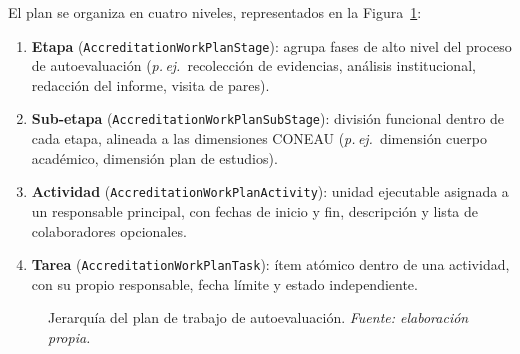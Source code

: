 El plan se organiza en cuatro niveles, representados en la
Figura~\ref{fig:workplan_jerarquia}:

\begin{enumerate}
  \item \textbf{Etapa} (\texttt{AccreditationWorkPlanStage}): agrupa fases
    de alto nivel del proceso de autoevaluación
    (\textit{p.\,ej.}\ recolección de evidencias, análisis institucional,
    redacción del informe, visita de pares).
  \item \textbf{Sub-etapa} (\texttt{AccreditationWorkPlanSubStage}): división
    funcional dentro de cada etapa, alineada a las dimensiones CONEAU
    (\textit{p.\,ej.}\ dimensión cuerpo académico, dimensión plan de estudios).
  \item \textbf{Actividad} (\texttt{AccreditationWorkPlanActivity}): unidad
    ejecutable asignada a un responsable principal, con fechas de inicio
    y fin, descripción y lista de colaboradores opcionales.
  \item \textbf{Tarea} (\texttt{AccreditationWorkPlanTask}): ítem atómico
    dentro de una actividad, con su propio responsable, fecha límite
    y estado independiente.
\end{enumerate}

\shorthandoff{<>}
\begin{figure}[H]
\centering
{}
\caption{Jerarquía del plan de trabajo de autoevaluación.
\textit{Fuente: elaboración propia.}}
\label{fig:workplan_jerarquia}
\end{figure}
\shorthandon{<>}

